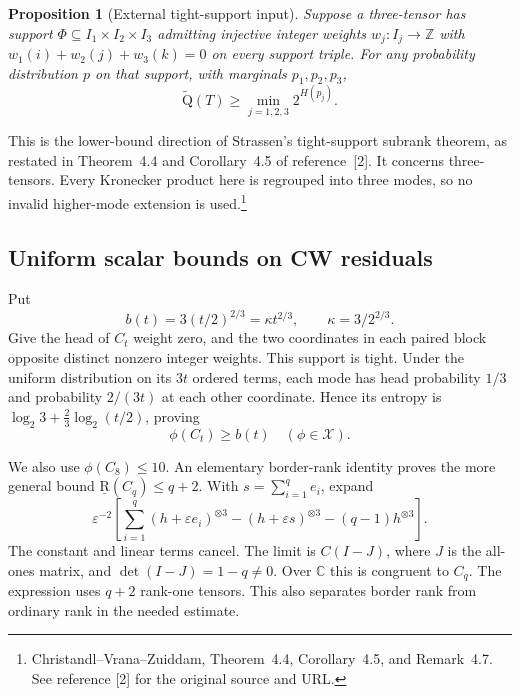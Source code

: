 \documentclass[11pt]{article}
\newtheorem{proposition}[theorem]{Proposition}
\theoremstyle{definition}\newtheorem{definition}[theorem]{Definition}
\theoremstyle{remark}\newtheorem{remark}[theorem]{Remark}
\newcommand{\AQ}{\widetilde{\mathrm Q}}
\newcommand{\BR}{\underline{\mathrm R}}
\newcommand{\X}{\mathcal X}
\newcommand{\C}{\mathbb C}
\newcommand{\sref}[2]{\footnote{#1. See reference [#2] for the original source and URL.}}
\begin{document}
\begin{proposition}[External tight-support input]\label{prop:tight}
Suppose a three-tensor has support $\Phi\subseteq I_1\times I_2\times I_3$ admitting injective integer weights $w_j:I_j\to\mathbb Z$ with $w_1(i)+w_2(j)+w_3(k)=0$ on every support triple. For any probability distribution $p$ on that support, with marginals $p_1,p_2,p_3$,
\[
 \AQ(T)\geq\min_{j=1,2,3}2^{H(p_j)}.
\]
\end{proposition}
This is the lower-bound direction of Strassen's tight-support subrank theorem, as restated in Theorem~4.4 and Corollary~4.5 of reference~[2]. It concerns three-tensors. Every Kronecker product here is regrouped into three modes, so no invalid higher-mode extension is used.\sref{Christandl--Vrana--Zuiddam, Theorem~4.4, Corollary~4.5, and Remark~4.7}{2}

\subsection{Uniform scalar bounds on CW residuals}

Put
\begin{equation}\label{eq:b}
 b(t)=3(t/2)^{2/3}=\kappa t^{2/3},\qquad \kappa=3/2^{2/3}.
\end{equation}
Give the head of $C_t$ weight zero, and the two coordinates in each paired block opposite distinct nonzero integer weights. This support is tight. Under the uniform distribution on its $3t$ ordered terms, each mode has head probability $1/3$ and probability $2/(3t)$ at each other coordinate. Hence its entropy is $\log_2 3+\frac23\log_2(t/2)$, proving
\begin{equation}\label{eq:cw-lower}
 \phi(C_t)\geq b(t)\quad(\phi\in\X).
\end{equation}

We also use $\phi(C_8)\leq10$. An elementary border-rank identity proves the more general bound $\BR(C_q)\leq q+2$. With $s=\sum_{i=1}^q e_i$, expand
\begin{equation}\label{eq:cw-border}
 \varepsilon^{-2}\left[
 \sum_{i=1}^q(h+\varepsilon e_i)^{\otimes3}
 -(h+\varepsilon s)^{\otimes3}-(q-1)h^{\otimes3}\right].
\end{equation}
The constant and linear terms cancel. The limit is $C(I-J)$, where $J$ is the all-ones matrix, and $\det(I-J)=1-q\ne0$. Over $\C$ this is congruent to $C_q$. The expression uses $q+2$ rank-one tensors. This also separates border rank from ordinary rank in the needed estimate.
\end{document}
